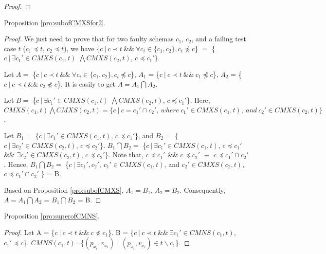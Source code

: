 {\begin{proof}
\end{proof}

Proposition \ref{pro:subofCMXSfor2}.
\begin{proof}

We just need to prove that for two faulty schemas $c_{1}$, $c_{2}$, and a failing test case $t$ ($c_{1} \preceq t$, $c_{2} \preceq t$), we have \{$c\ |\ c \prec t\ \&\&\ \forall c_{i} \in \{c_{1}, c_{2}\}, c_{i} \npreceq c $\} $=$  \{$ c\ |\ \exists c_{1}' \in CMXS(c_{1}, t)$ $\bigwedge CMXS(c_{2}, t)$, $c \preceq c_{1}'$\}.

Let $A = $ \{$c\ |\ c \prec t\ \&\&\ \forall c_{i} \in \{c_{1}, c_{2}\}, c_{i} \npreceq c $\}, $A_{1}$ = \{$c\ |\ c \prec t\ \&\&\  c_{1} \npreceq c $\}, $A_{2}$ = \{$c\ |\ c \prec t\ \&\&\  c_{2} \npreceq c $\}. It is easily to get $A = A_{1} \bigcap A_{2}$.

Let $B = $ \{$ c\ |\ \exists c_{1}' \in CMXS(c_{1}, t)$ $\bigwedge CMXS(c_{2}, t)$, $c \preceq c_{1}'$\}. Here,  $ CMXS(c_{1}, t) \bigwedge CMXS(c_{2}, t) = \{ c\ |\ c = c_{1}' \cap c_{2}',\ where\ c_{1}' \in CMXS(c_{1}, t),\ and\ c_{2}' \in CMXS(c_{2}, t) \}$.

Let $B_{1} = $ \{$ c\ |\ \exists c_{1}' \in CMXS(c_{1}, t)$, $c \preceq c_{1}'$\}, and $B_{2} = $ \{$ c\ |\ \exists c_{2}' \in CMXS(c_{2}, t)$, $c \preceq c_{2}'$\}. $B_{1} \bigcap B_{2} = $ \{$ c\ |\ \exists c_{1}' \in CMXS(c_{1}, t)$, $c \preceq c_{1}'$ \&\& $\exists c_{2}' \in CMXS(c_{2}, t)$, $c \preceq c_{2}'$\}. Note that, $c \preceq c_{1}'$ \&\& $c \preceq c_{2}'$ $\equiv$ $c \preceq c_{1}' \cap c_{2}'$. Hence, $B_{1} \bigcap B_{2} = $ \{$ c\ |\ \exists c_{1}', c_{2}',\  c_{1}' \in CMXS(c_{1}, t)$, and $c_{2}' \in CMXS(c_{2}, t)$, $c \preceq c_{1}' \cap c_{2}'$ \} = B.

Based on Proposition \ref{pro:subofCMXS}, $A_{1} = B_{1}$, $A_{2} = B_{2}$. Consequently,
$A = A_{1} \bigcap A_{2}$ = $B_{1} \bigcap B_{2}$  = B.

\end{proof}

Proposition \ref{pro:superofCMNS}.


\begin{proof}
Let A = \{$c\ |\ c \prec t\ \&\&\ c \npreceq c_{1}$\}. B = \{$ c\ |\ c \prec t \ \&\&\  \exists c_{1}' \in CMNS(c_{1}, t)$, $c_{1}' \preceq c$\}. $CMNS(c_{1},t)$=\{$(p_{x_{i}}, v_{x_{i}})$ | $(p_{x_{i}}, v_{x_{i}}) \in t \backslash c_{1} $\}.


\end{proof}}
